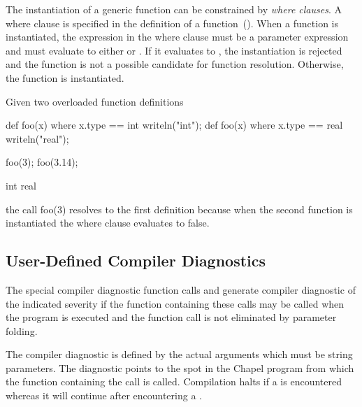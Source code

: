 The instantiation of a generic function can be constrained by {\em
where clauses}.  A where clause is specified in the definition of a
function~().  When a function is
instantiated, the expression in the where clause must be a parameter
expression and must evaluate to either  or .
If it evaluates to , the instantiation is rejected and the
function is not a possible candidate for function resolution.
Otherwise, the function is instantiated.
\begin{example}
Given two overloaded function definitions
\begin{chapelpre}
\end{chapelpre}
\begin{chapel}
def foo(x) where x.type == int { writeln("int"); }
def foo(x) where x.type == real { writeln("real"); }
\end{chapel}
\begin{chapelpost}
foo(3);
foo(3.14);
\end{chapelpost}
\begin{chapeloutput}
int
real
\end{chapeloutput}
the call foo(3) resolves to the first definition because when the
second function is instantiated the where clause evaluates to false.
\end{example}

\subsection{User-Defined Compiler Diagnostics}
\label{User_Defined_Compiler_Errors}

The special compiler diagnostic function calls 
and  generate compiler diagnostic of the
indicated severity if the function containing these calls may be
called when the program is executed and the function call is not
eliminated by parameter folding.

The compiler diagnostic is defined by the actual arguments which must
be string parameters.  The diagnostic points to the spot in the Chapel
program from which the function containing the call is called.
Compilation halts if a  is encountered whereas it
will continue after encountering a .


